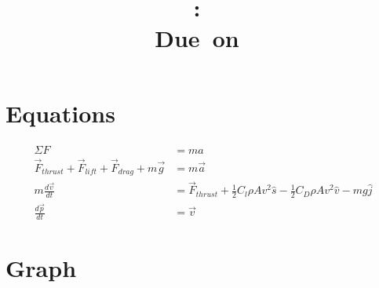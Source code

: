\documentclass[11pt]{article} %
\title{
\vspace{2in}
\textmd{\textbf{\hmwkClass:\ \hmwkTitle}}\\
\normalsize\vspace{0.1in}\small{Due\ on\ \hmwkDueDate}\\
\vspace{3in}
}
\author{\textbf{\hmwkAuthorName}}
\date{} %
\begin{document}
\maketitle 
\vspace{1in} %
\newpage %

\section*{Equations}

\begin{align*}
\Sigma F &=ma \\
\vec{F}_{thrust} + \vec{F}_{lift} + \vec{F}_{drag} + m\vec{g} &= m\vec{a} \\
m\frac{d\vec{v}}{dt} &= \vec{F}_{thrust} + \frac{1}{2}C_l\rho A v^2\hat{s} - \frac{1}{2}C_D\rho A v^2 \hat{v} - mg\hat{j} \\
\frac{d\vec{p}}{dt} &= \vec{v}
\end{align*}

\section*{Graph} %

\ \\ \\ \\ \\ \\ \\ \\ \\ \\ \\ \\ \\ \\ \\ \\ \\ \\ \\
\end{document}

